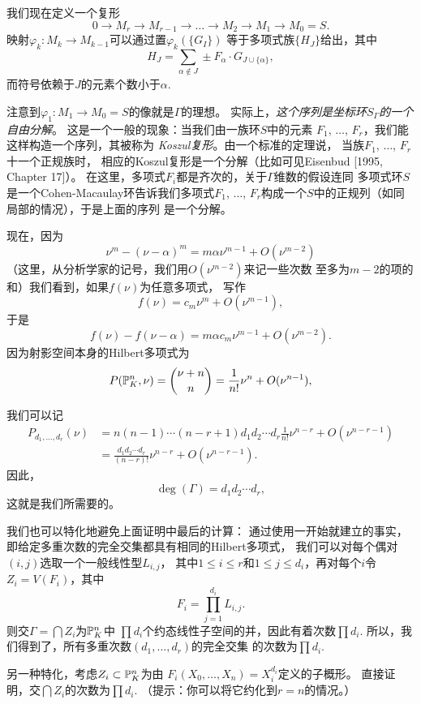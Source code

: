 我们现在定义一个复形
\[
	0\longrightarrow M_r\longrightarrow M_{r-1}
	 \longrightarrow \dots \longrightarrow M_2
	 \longrightarrow M_1\longrightarrow M_0=S.
\]
映射$\varphi_k:M_k\to M_{k-1}$可以通过置$\varphi_k(\{G_I\})$
等于多项式族$\{H_J\}$给出，其中
\[
	H_J=\sum_{\alpha\not\in J}\pm F_\alpha\cdot 
	G_{J\cup \{\alpha\}},
\]
而符号依赖于$J$的元素个数小于$\alpha$.

注意到$\varphi_1:M_1\to M_0=S$的像就是$\Gamma$的理想。
实际上，\textit{这个序列是坐标环$S_\Gamma$的一个自由分解}。
这是一个一般的现象：当我们由一族环$S$中的元素
$F_1$, $\dots$, $F_r$，我们能这样构造一个序列，其被称为
\textit{Koszul复形}。由一个标准的定理说，
当族$F_1$, $\dots$, $F_r$十一个正规族时，
相应的Koszul复形是一个分解（比如可见Eisenbud [1995, Chapter 17]）。
在这里，多项式$F_i$都是齐次的，关于$\Gamma$维数的假设连同
多项式环$S$是一个Cohen-Macaulay环告诉我们多项式$F_1$, $\dots$,
$F_r$构成一个$S$中的正规列（如同局部的情况），于是上面的序列
是一个分解。

\nottran

现在，因为
\[
	\nu^m-(\nu-\alpha)^m=m\alpha\nu^{m-1}+O(\nu^{m-2})
\]
（这里，从分析学家的记号，我们用$O(\nu^{m-2})$来记一些次数
至多为$m-2$的项的和）我们看到，如果$f(\nu)$为任意多项式，
写作
\[
	f(\nu)=c_m\nu^m+O(\nu^{m-1}),
\]
于是
\[
	f(\nu)-f(\nu-\alpha)=m\alpha c_m\nu^{m-1}+O(\nu^{m-2}).
\]
因为射影空间本身的Hilbert多项式为
\[
	P(\P_K^n,\nu)=\binom{\nu+n}{n}=\frac{1}{n!}\nu^n+
	O(\nu^{n-1}),
\]


我们可以记
\begin{align*}
P_{d_1,\dots,d_r}(\nu)&=n(n-1)\cdots (n-r+1)d_1d_2\cdots
	d_r\frac 1{n!} \nu^{n-r}+O(\nu^{n-r-1})\\
&=\frac{d_1d_2\cdots d_r}{(n-r)!}\nu^{n-r}+O(\nu^{n-r-1}).
\end{align*}
因此，
\[
	\deg(\Gamma)=d_1d_2\cdots d_r,
\]
这就是我们所需要的。

我们也可以特化地避免上面证明中最后的计算：
通过使用一开始就建立的事实，
即给定多重次数的完全交集都具有相同的Hilbert多项式，
我们可以对每个偶对$(i,j)$选取一个一般线性型$L_{i,j}$，
其中$1\leq i\leq r$和$1\leq j\leq d_i$，再对每个$i$令
$Z_i=V(F_i)$，其中
\[
	F_i=\prod_{j=1}^{d_i}L_{i,j}.
\]
则交$\Gamma=\bigcap Z_i$为$\P_K^n$中
$\prod d_i$个约态线性子空间的并，因此有着次数$\prod d_i$.
所以，我们得到了，所有多重次数$(d_1,\dots,d_r)$的完全交集
的次数为$\prod d_i$.

\begin{exe}\label{exe:3.77}
另一种特化，考虑$Z_i\subset \P_K^n$为由
$F_i(X_0,\dots,X_n)=X_i^{d_i}$定义的子概形。
直接证明，交$\bigcap Z_i$的次数为$\prod d_i$. 
（提示：你可以将它约化到$r=n$的情况。）
\end{exe}

